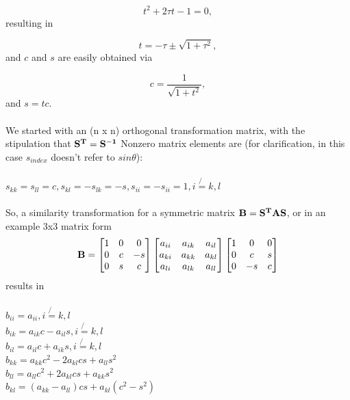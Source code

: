 \documentclass[%
reprint,
superscriptaddress,
showpacs,
nofootinbib,
bibnotes,amsmath,amssymb,aps,
prc, 
]{revtex4-1}
\begin{document}
\begin{equation*}
t^2+2\tau t-1= 0,
\end{equation*}
resulting in

\begin{equation*}
t = -\tau \pm \sqrt{1+\tau^2},
\end{equation*}
and $c$ and $s$ are easily obtained via

\begin{equation*}
c = \frac{1}{\sqrt{1+t^2}},
\end{equation*}
and $s=tc$.  
\\ \\
We started with an (n x n) orthogonal transformation matrix, with the stipulation that  
$\bold{S^T}=\bold{S^{-1}}$
Nonzero matrix elements are (for clarification, in this case $s_{index}$ doesn't refer to $sin\theta$):
\\ \\
$s_{kk}=s_{ll}=c,s_{kl}=-s_{lk}=-s,s_{ii}=-s_{ii}= 1,  i\not{=}k, l$
\\ \\
So, a similarity transformation for a symmetric matrix
$\bold{B}=\bold{S^T}\bold{A}\bold{S}$, or in an example 3x3 matrix form
\begin{equation*}
\bold{B} = 
\begin{bmatrix}1 & 0 & 0\\ 0 & c & -s \\ 0 & s & c \\\end{bmatrix} 
\begin{bmatrix} a_{ii} & a_{ik} & a_{il} \\  a_{ki} & a_{kk} & a_{kl} \\ a_{li} & a_{lk} & a_{ll} \\ \end{bmatrix} 
\begin{bmatrix} 1 & 0 & 0 \\ 0 & c & s \\0 & -s & c\\\end{bmatrix}
\end{equation*}
results in \\ \\
$b_{ii}=a_{ii}, i\not{=}k, l$\\
$b_{ik}=a_{ik}c-a_{il}s, i\not{=}k, l$\\
$b_{il}=a_{il}c+a_{ik}s, i\not{=}k, l$\\
$b_{kk}=a_{kk}c^{2}-2a_{kl}cs+a_{ll}s^{2}$\\
$b_{ll}=a_{ll}c^{2}+2a_{kl}cs+a_{kk}s^{2}$\\
$b_{kl}=(a_{kk}-a_{ll})cs+a_{kl}(c^{2}-s^{2})$ \\
\end{document}
